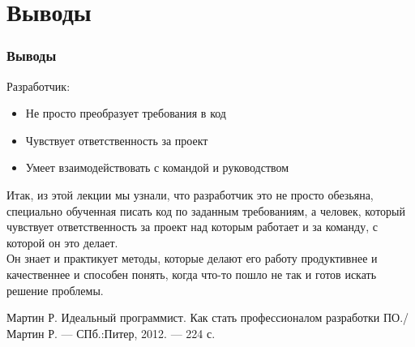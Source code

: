 \documentclass{../industrial-development}
\begin{document}
\section{Выводы}
\begin{frame} \frametitle{Выводы}
Разработчик:
\begin{itemize}
  \item Не просто преобразует требования в код
	\item Чувствует ответственность за проект
	\item Умеет взаимодействовать с командой и руководством
\end{itemize}
\end{frame}
\lecturenotes
Итак, из этой лекции мы узнали, что разработчик это не просто обезьяна, специально обученная писать код по заданным требованиям, а человек, который чувствует ответственность за проект над которым работает и за команду, с которой он это делает.\\
Он знает и практикует методы, которые делают его работу продуктивнее и качественнее и способен понять, когда что-то пошло не так и готов искать решение проблемы.


\begin{thebibliography}{99}
 {Мартин Р. Идеальный программист. Как стать профессионалом разработки ПО./Мартин Р. — СПб.:Питер, 2012. — 224 с.}
\end{thebibliography}
\end{document}
